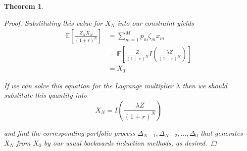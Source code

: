 \documentclass[12pt]{article}
\newtheorem{theorem}{Theorem}
\newlength\tindent
\renewcommand{\indent}{\hspace*{\tindent}}
\newcommand{\E}{\mathbb E}
\begin{document}
\begin{theorem}
\begin{proof}
Substituting this value for $X_N$ into our constraint yields
\begin{align*}
	\E \left[ \frac{Z_NX_N}{(1 + r)^N} \right] &= \sum^M_{m = 1} p_m\zeta_m x_m \\
	&= \E \left[ \frac{Z}{(1 + r)^N} I\left( \frac{\lambda Z}{(1 + r)^N} \right) \right] \\
	&= X_0
\end{align*}

\indent If we can solve this equation for the Lagrange multiplier $\lambda$ then we should substitute this quantity into 
\begin{equation*}
	X_N = I \left( \frac{\lambda Z}{(1 + r)^N} \right)
\end{equation*}

and find the corresponding portfolio process $\Delta_{N - 1}, \Delta_{N - 2},..., \Delta_0$ that generates $X_N$ from $X_0$ by our usual backwards induction methods, as desired.
\end{proof}
\end{theorem}
\end{document}
